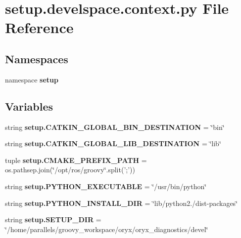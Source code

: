 \section{setup.\-develspace.\-context.\-py \-File \-Reference}
\label{setup_8develspace_8context_8py}
\subsection*{\-Namespaces}
\begin{DoxyCompactItemize}
\item 
namespace {\bf setup}
\end{DoxyCompactItemize}
\subsection*{\-Variables}
\begin{DoxyCompactItemize}
\item 
string {\bf setup.\-C\-A\-T\-K\-I\-N\-\_\-\-G\-L\-O\-B\-A\-L\-\_\-\-B\-I\-N\-\_\-\-D\-E\-S\-T\-I\-N\-A\-T\-I\-O\-N} = \char`\"{}bin\char`\"{}
\item 
string {\bf setup.\-C\-A\-T\-K\-I\-N\-\_\-\-G\-L\-O\-B\-A\-L\-\_\-\-L\-I\-B\-\_\-\-D\-E\-S\-T\-I\-N\-A\-T\-I\-O\-N} = \char`\"{}lib\char`\"{}
\item 
tuple {\bf setup.\-C\-M\-A\-K\-E\-\_\-\-P\-R\-E\-F\-I\-X\-\_\-\-P\-A\-T\-H} = os.\-pathsep.\-join(\char`\"{}/opt/ros/groovy\char`\"{}.split(';'))
\item 
string {\bf setup.\-P\-Y\-T\-H\-O\-N\-\_\-\-E\-X\-E\-C\-U\-T\-A\-B\-L\-E} = \char`\"{}/usr/bin/python\char`\"{}
\item 
string {\bf setup.\-P\-Y\-T\-H\-O\-N\-\_\-\-I\-N\-S\-T\-A\-L\-L\-\_\-\-D\-I\-R} = \char`\"{}lib/python2./dist-\/packages\char`\"{}
\item 
string {\bf setup.\-S\-E\-T\-U\-P\-\_\-\-D\-I\-R} = \char`\"{}/home/parallels/groovy\-\_\-workspace/oryx/oryx\-\_\-diagnostics/devel\char`\"{}
\end{DoxyCompactItemize}
